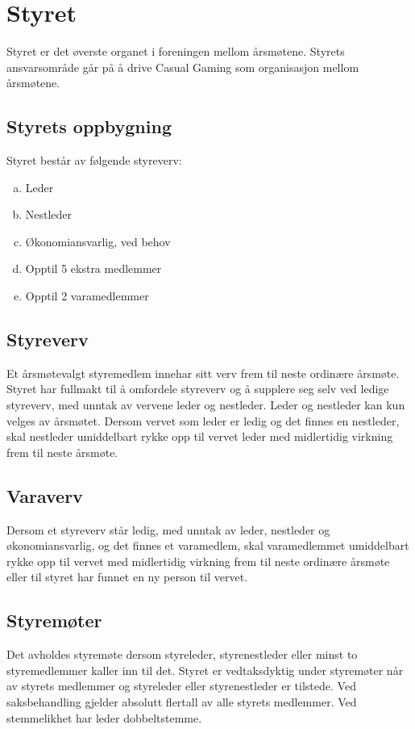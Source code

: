 \chapter{Styret}
Styret er det øverste organet i foreningen mellom årsmøtene. Styrets ansvarsområde går på å drive Casual Gaming som organisasjon mellom årsmøtene.

\section{Styrets oppbygning}
Styret består av følgende styreverv:
\begin{enumerate}[a.]
    \item Leder
    \item Nestleder
    \item Økonomiansvarlig, ved behov
    \item Opptil 5 ekstra medlemmer
    \item Opptil 2 varamedlemmer
\end{enumerate}

\section{Styreverv}
Et årsmøtevalgt styremedlem innehar sitt verv frem til neste ordinære årsmøte. Styret har fullmakt til å omfordele styreverv og å supplere seg selv ved ledige styreverv, med unntak av vervene leder og nestleder. Leder og nestleder kan kun velges av årsmøtet. Dersom vervet som leder er ledig og det finnes en nestleder, skal nestleder umiddelbart rykke opp til vervet leder med midlertidig virkning frem til neste årsmøte.

\section{Varaverv}
Dersom et styreverv står ledig, med unntak av leder, nestleder og økonomiansvarlig, og det finnes et varamedlem, skal varamedlemmet umiddelbart rykke opp til vervet med midlertidig virkning frem til neste ordinære årsmøte eller til styret har funnet en ny person til vervet.

\section{Styremøter}
Det avholdes styremøte dersom styreleder, styrenestleder eller minst to styremedlemmer kaller inn til det. Styret er vedtaksdyktig under styremøter når  av styrets medlemmer og styreleder eller styrenestleder er tilstede. Ved saksbehandling gjelder absolutt flertall av alle styrets medlemmer. Ved stemmelikhet har leder dobbeltstemme.


